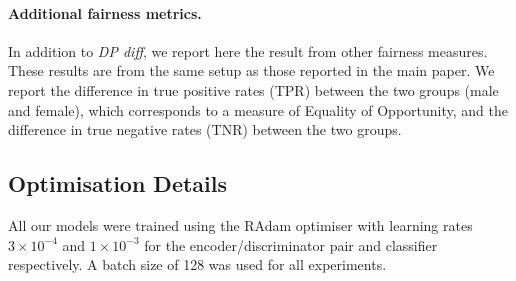 \begin{table}[tbp]
    \caption{
        Additional fairness metrics for the experiments on the CelebA dataset (fig.~\ref{fig:celeba-multiplot} from the main text).
        \emph{TPR diff.}\ refers to the difference in true positive rate.
        \emph{TNR diff.}\ refers to the difference in true negative rate.
        \textsc{Left:} $\eta = 0$. \textsc{Right:} $\eta=1$.
    }
    \label{tab:my_label}
\hfill
{}
\end{table}
\paragraph{Additional fairness metrics.}
In addition to \emph{DP diff}, we report here the result from other fairness measures.
These results are from the same setup as those reported in the main paper.
We report the difference in true positive rates (TPR) between the two groups (male and female), which corresponds to a measure of Equality of Opportunity,
and the difference in true negative rates (TNR) between the two groups.

\subsection{Optimisation Details}\label{sec:optimisation-details}
\noindent All our models were trained using the RAdam optimiser \citep{liu2019variance} with learning rates $3\times10^{-4}$ and $1\times10^{-3}$ for the encoder/discriminator pair and classifier respectively. A batch size of 128 was used for all experiments.

